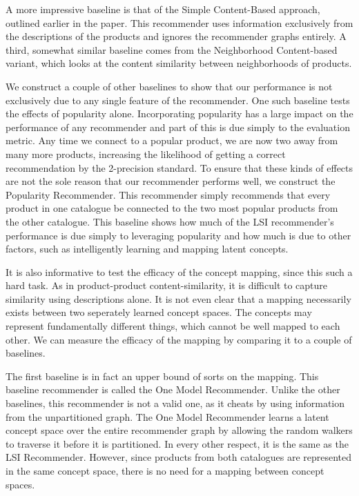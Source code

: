 \documentclass[11pt]{article}
\begin{document}
A more impressive baseline is that of the Simple Content-Based approach, 
outlined earlier in the paper. This recommender uses information exclusively
from the descriptions of the products and ignores the recommender graphs 
entirely. A third, somewhat similar baseline comes from the Neighborhood 
Content-based variant, which looks at the content similarity between 
neighborhoods of products.

We construct a couple of other baselines to show that our performance is not
exclusively due to any single feature of the recommender. One such baseline
tests the effects of popularity alone. Incorporating popularity has a large 
impact on the performance of any recommender and part of this is due simply 
to the evaluation metric. Any time we connect to a popular product, we are 
now two away from many more products, increasing the likelihood of getting a
correct recommendation by the 2-precision standard. To ensure that these kinds 
of effects are not the sole reason that our recommender performs well, 
we construct the Popularity Recommender. This recommender simply recommends 
that every product in one catalogue be connected to the two most popular 
products from the other catalogue. This baseline shows how much of the LSI 
recommender's performance is due simply to leveraging popularity and how 
much is due to other factors, such as intelligently learning and mapping 
latent concepts.

It is also informative to test the efficacy of the concept mapping, since this
such a hard task. As in product-product content-similarity, it is difficult to
capture similarity using descriptions alone. It is not even clear that a mapping 
necessarily exists between two seperately learned concept spaces. The concepts 
may represent fundamentally different things, which cannot be well mapped to 
each other. We can measure the efficacy of the mapping by comparing it to a 
couple of baselines. 

The first baseline is in fact an upper bound of sorts on the mapping. This
baseline recommender is called the One Model Recommender. Unlike the other
baselines, this recommender is not a valid one, as it cheats by using
information from the unpartitioned graph. The One Model Recommender learns a
latent concept space over the entire recommender graph by allowing the random
walkers to traverse it before it is partitioned. In every other respect, it is
the same as the LSI Recommender. However, since products from both catalogues
are represented in the same concept space, there is no need for a mapping
between concept spaces.
\end{document}
